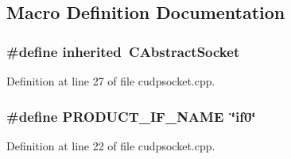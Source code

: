 \subsection{Macro Definition Documentation}
\subsubsection[{inherited}]{\setlength{\rightskip}{0pt plus 5cm}\#define inherited~C\+Abstract\+Socket}\label{cudpsocket_8cpp_a3920e3b7cb0909b941b2409493acf8f1}


Definition at line 27 of file cudpsocket.\+cpp.

\subsubsection[{P\+R\+O\+D\+U\+C\+T\+\_\+\+I\+F\+\_\+\+N\+A\+ME}]{\setlength{\rightskip}{0pt plus 5cm}\#define P\+R\+O\+D\+U\+C\+T\+\_\+\+I\+F\+\_\+\+N\+A\+ME~\char`\"{}if0\char`\"{}}\label{cudpsocket_8cpp_ab6459411f683e58127b336daedd2c0aa}


Definition at line 22 of file cudpsocket.\+cpp.

